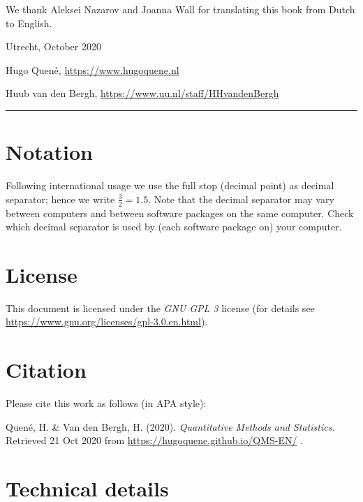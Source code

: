 \documentclass[
]{book}
\begin{document}
We thank Aleksei Nazarov and Joanna Wall for translating this book from Dutch to English.

Utrecht, October 2020

Hugo Quené, \url{https://www.hugoquene.nl}

Huub van den Bergh, \url{https://www.uu.nl/staff/HHvandenBergh}

\begin{center}\rule{0.5\linewidth}{0.5pt}\end{center}

\hypertarget{notation}{%
\section*{Notation}\label{notation}}

Following international usage we use the full stop (decimal point) as decimal separator; hence we write \(\frac{3}{2}=1.5\). Note that the decimal separator may vary between computers and between software packages on the same computer. Check which decimal separator is used by (each software package on) your computer.

\hypertarget{license}{%
\section*{License}\label{license}}

This document is licensed under the \emph{GNU GPL 3} license (for details see
\url{https://www.gnu.org/licenses/gpl-3.0.en.html}).

\hypertarget{citation}{%
\section*{Citation}\label{citation}}

Please cite this work as follows (in APA style):

Quené, H. \& Van den Bergh, H. (2020). \emph{Quantitative Methods and Statistics}.
Retrieved 21 Oct 2020 from \url{https://hugoquene.github.io/QMS-EN/} .

\hypertarget{technical-details}{%
\section*{Technical details}\label{technical-details}}
\end{document}
